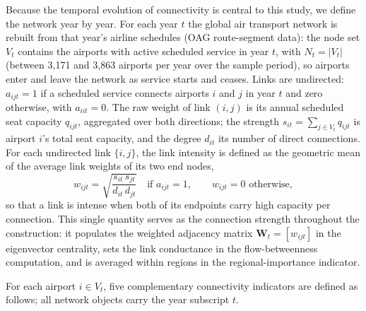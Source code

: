Because the temporal evolution of connectivity is central to this study, we define the network year by year. For each year $t$ the global air transport network is rebuilt from that year's airline schedules (OAG route-segment data): the node set $V_t$ contains the airports with active scheduled service in year $t$, with $N_t=|V_t|$ (between 3{,}171 and 3{,}863 airports per year over the sample period), so airports enter and leave the network as service starts and ceases. Links are undirected: $a_{ijt}=1$ if a scheduled service connects airports $i$ and $j$ in year $t$ and zero otherwise, with $a_{iit}=0$. The raw weight of link $(i,j)$ is its annual scheduled seat capacity $q_{ijt}$, aggregated over both directions; the strength $s_{it}=\sum_{j\in V_t} q_{ijt}$ is airport $i$'s total seat capacity, and the degree $d_{it}$ its number of direct connections. For each undirected link $\{i,j\}$, the link intensity is defined as the geometric mean of the average link weights of its two end nodes,
\begin{equation}
    w_{ijt}
    =
    \sqrt{\frac{s_{it}\,s_{jt}}{d_{it}\,d_{jt}}}
    \quad\text{if } a_{ijt}=1,
    \qquad w_{ijt}=0 \text{ otherwise},
    \label{eq:gaci_link_intensity}
\end{equation}
so that a link is intense when both of its endpoints carry high capacity per connection. This single quantity serves as the connection strength throughout the construction: it populates the weighted adjacency matrix $\mathbf{W}_t=[w_{ijt}]$ in the eigenvector centrality, sets the link conductance in the flow-betweenness computation, and is averaged within regions in the regional-importance indicator.

For each airport $i \in V_t$, five complementary connectivity indicators are defined as follows; all network objects carry the year subscript $t$.

